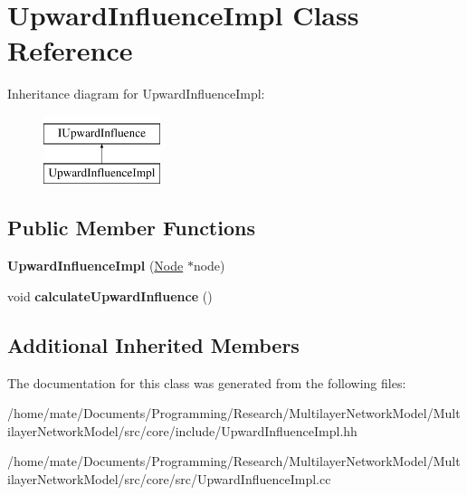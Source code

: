 \hypertarget{classUpwardInfluenceImpl}{}\section{Upward\+Influence\+Impl Class Reference}
\label{classUpwardInfluenceImpl}
Inheritance diagram for Upward\+Influence\+Impl\+:\begin{figure}[H]
\begin{center}
\leavevmode
\includegraphics[height=2.000000cm]{classUpwardInfluenceImpl}
\end{center}
\end{figure}
\subsection*{Public Member Functions}
\begin{DoxyCompactItemize}
\item 
{\bfseries Upward\+Influence\+Impl} (\hyperlink{classNode}{Node} $\ast$node)\hypertarget{classUpwardInfluenceImpl_a33c1dc6e1d3cd99e7fab6c9cbc797fcf}{}\label{classUpwardInfluenceImpl_a33c1dc6e1d3cd99e7fab6c9cbc797fcf}

\item 
void {\bfseries calculate\+Upward\+Influence} ()\hypertarget{classUpwardInfluenceImpl_a30b4639db2644244553b54300f84a12c}{}\label{classUpwardInfluenceImpl_a30b4639db2644244553b54300f84a12c}

\end{DoxyCompactItemize}
\subsection*{Additional Inherited Members}


The documentation for this class was generated from the following files\+:\begin{DoxyCompactItemize}
\item 
/home/mate/\+Documents/\+Programming/\+Research/\+Multilayer\+Network\+Model/\+Multilayer\+Network\+Model/src/core/include/Upward\+Influence\+Impl.\+hh\item 
/home/mate/\+Documents/\+Programming/\+Research/\+Multilayer\+Network\+Model/\+Multilayer\+Network\+Model/src/core/src/Upward\+Influence\+Impl.\+cc\end{DoxyCompactItemize}
